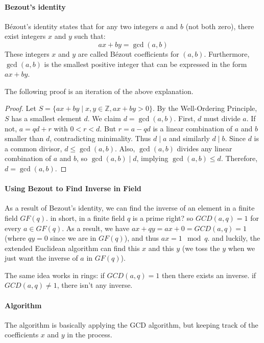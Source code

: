 \paragraph{Bezout's identity}
Bézout's identity states that for any two integers $a$ and $b$ (not both zero), there exist integers $x$ and $y$ such that:
$$ ax + by = \gcd(a, b) $$
These integers $x$ and $y$ are called Bézout coefficients for $(a, b)$. Furthermore, $\gcd(a, b)$ is the smallest positive integer that can be expressed in the form $ax + by$.

The following proof is an iteration of the above explanation.
\begin{proof}
    Let $S = \{ax + by \mid x, y \in \mathbb{Z}, ax + by > 0\}$. By the Well-Ordering Principle, $S$ has a smallest element $d$.
    We claim $d = \gcd(a, b)$.
    First, $d$ must divide $a$. If not, $a = qd + r$ with $0 < r < d$.
    But $r = a - qd$ is a linear combination of $a$ and $b$ smaller than $d$, contradicting minimality. Thus $d \mid a$ and similarly $d \mid b$.
    Since $d$ is a common divisor, $d \le \gcd(a, b)$. Also, $\gcd(a, b)$ divides any linear combination of $a$ and $b$, so $\gcd(a, b) \mid d$, implying $\gcd(a, b) \le d$.
    Therefore, $d = \gcd(a, b)$.
\end{proof}

\paragraph{Using Bezout to Find Inverse in Field}
As a result of Bezout's identity, we can find the inverse of an element in a finite field $GF(q)$. 
in short, in a finite field $q$ is a prime right? so $GCD(a,q)=1$ for every $a\in GF(q)$.
As a result, we have $ax+qy=ax+0=GCD(a,q)=1$ (where $qy=0$ since we are in $GF(q)$), and thus $ax=1 \mod q$. and luckily, the 
extended Euclidean algorithm can find this $x$ and this $y$ (we toss the $y$ when we just want the inverse of $a$ in $GF(q)$).

The same idea works in rings: if $GCD(a,q)=1$ then there exists an inverse.
if $GCD(a,q)\neq 1$, there isn't any inverse. 


\paragraph{Algorithm}

The algorithm is basically applying the GCD algorithm, but keeping track of the coefficients $x$ and $y$ in the process.

